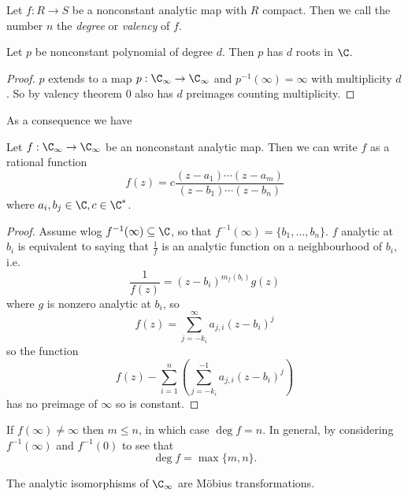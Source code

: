 \documentclass[a4paper]{article}
\begin{document}
\begin{definition}
  Let \(f: R \to S\) be a nonconstant analytic map with \(R\) compact. Then we call the number \(n\) the \emph{degree} or \emph{valency} of \(f\).
\end{definition}

\begin{corollary}
  Let \(p\) be nonconstant polynomial of degree \(d\). Then \(p\) has \(d\) roots in \(\C\).
\end{corollary}

\begin{proof}
  \(p\) extends to a map \(p: \C_\infty \to \C_\infty\) and \(p^{-1}(\infty) = \infty\) with multiplicity \(d\). So by valency theorem \(0\) also has \(d\) preimages counting multiplicity.
\end{proof}

As a consequence we have

\begin{proposition}
  Let \(f: \C_\infty \to \C_\infty\) be an nonconstant analytic map. Then we can write \(f\) as a rational function
  \[
    f(z) = c \frac{(z - a_1) \cdots (z - a_m)}{(z - b_1) \cdots (z - b_n)}
  \]
  where \(a_i, b_j \in \C, c \in \C^*\).
\end{proposition}

\begin{proof}
  Assume wlog \(f^{-1}(\infty) \subseteq \C\), so that \(f^{-1}(\infty) = \{b_1, \dots, b_n\}\). \(f\) analytic at \(b_i\) is equivalent to saying that \(\frac{1}{f}\) is an analytic function on a neighbourhood of \(b_i\), i.e.
  \[
    \frac{1}{f(z)} = (z - b_i)^{m_f(b_i)} g(z)
  \]
  where \(g\) is nonzero analytic at \(b_i\), so
  \[
    f(z) = \sum_{j = -k_i}^\infty a_{j, i} (z - b_i)^j
  \]
  so the function
  \[
    f(z) - \sum_{i = 1}^n \left(\sum_{j = -k_i}^{-1} a_{j, i} (z - b_i)^j \right)
  \]
  has no preimage of \(\infty\) so is constant.
\end{proof}

\begin{remark}
  If \(f(\infty) \neq \infty\) then \(m \leq n\), in which case \(\deg f = n\). In general, by considering \(f^{-1}(\infty)\) and \(f^{-1}(0)\) to see that
  \[
    \deg f = \max \{m, n\}.
  \]
\end{remark}

\begin{corollary}
  The analytic isomorphisms of \(\C_\infty\) are Möbius transformations.
\end{corollary}
\end{document}
